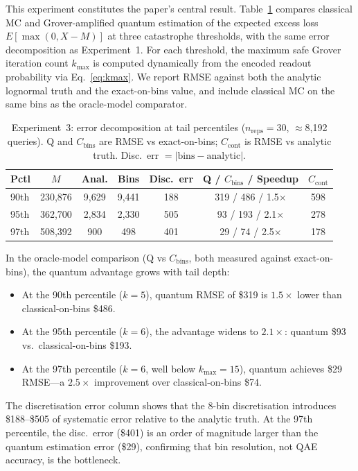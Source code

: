 \documentclass[11pt,a4paper]{article}
\begin{document}
This experiment constitutes the paper's central result. Table~\ref{tab:exp3} compares classical MC and Grover-amplified quantum estimation of the expected excess loss $E[\max(0, X - M)]$ at three catastrophe thresholds, with the same error decomposition as Experiment~1. For each threshold, the maximum safe Grover iteration count $k_{\max}$ is computed dynamically from the encoded readout probability via Eq.~\ref{eq:kmax}. We report RMSE against both the analytic lognormal truth and the exact-on-bins value, and include classical MC on the same bins as the oracle-model comparator.

\begin{table}[t]
\centering
\caption{Experiment~3: error decomposition at tail percentiles ($n_{\text{reps}}=30$, $\approx$8,192 queries). Q and $C_{\text{bins}}$ are RMSE vs exact-on-bins; $C_{\text{cont}}$ is RMSE vs analytic truth. Disc.\ err $= |\text{bins} - \text{analytic}|$.}
\label{tab:exp3}
\begin{tabular}{lcccccc}
\toprule
Pctl & $M$ & Anal. & Bins & Disc.\ err & Q / $C_{\text{bins}}$ / Speedup & $C_{\text{cont}}$ \\
\midrule
90th & 230,876 & 9,629 & 9,441 & 188 & 319 / 486 / 1.5$\times$ & 598 \\
95th & 362,700 & 2,834 & 2,330 & 505 & 93 / 193 / 2.1$\times$ & 278 \\
97th & 508,392 & 900 & 498 & 401 & 29 / 74 / 2.5$\times$ & 178 \\
\bottomrule
\end{tabular}
\end{table}

In the oracle-model comparison (Q vs $C_{\text{bins}}$, both measured against exact-on-bins), the quantum advantage grows with tail depth:

\begin{itemize}
    \item At the 90th percentile ($k=5$), quantum RMSE of \$319 is $1.5\times$ lower than classical-on-bins \$486.
    \item At the 95th percentile ($k=6$), the advantage widens to $2.1\times$: quantum \$93 vs.\ classical-on-bins \$193.
    \item At the 97th percentile ($k=6$, well below $k_{\max} = 15$), quantum achieves \$29 RMSE---a $2.5\times$ improvement over classical-on-bins \$74.
\end{itemize}

The discretisation error column shows that the 8-bin discretisation introduces \$188--\$505 of systematic error relative to the analytic truth. At the 97th percentile, the disc.\ error (\$401) is an order of magnitude larger than the quantum estimation error (\$29), confirming that bin resolution, not QAE accuracy, is the bottleneck.
\end{document}
